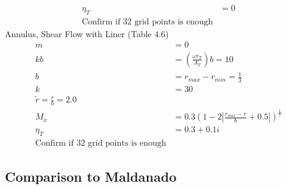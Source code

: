 \documentclass[12pt]{uthesis-v12}  %
\begin{document}
\begin{itemize}
\begin{align*}
            \eta_T &= 0\\
            \text{Confirm if 32 grid points is enough}
        \end{align*}
        \subitem Annulus, Shear Flow with Liner (Table 4.6)
        \begin{align*}
            m &= 0 \\
            kb &= \left(\frac{\omega r_T}{A_T}\right)b = 10 \\
            b &= r_{max} - r_{min}  = \frac{1}{3}\\
            k &= 30 \\
            \tilde{r} = \frac{r}{b} = 2.0 \\
            M_x &= 0.3\left(1 - 2 \left| \frac{r_{max}-r}{b} + 0.5 \right|  \right)^{\frac{1}{7}} \\
            \eta_T &= 0.3 + 0.1i\\
            \text{Confirm if 32 grid points is enough}
        \end{align*}
\end{itemize}






\subsection{Comparison to Maldanado}



\appendix
\end{document}
